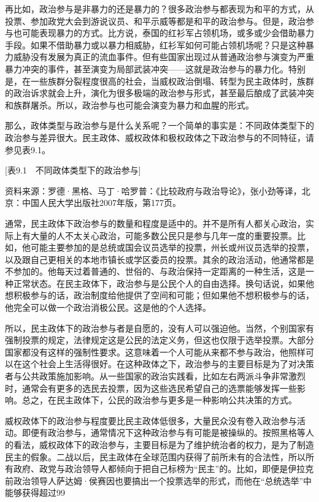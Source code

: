 {再比如，政治参与是非暴力的还是暴力的？很多政治参与都表现为和平的方式，从投票、参加政党大会到游说议员、和平示威等都是和平的政治参与。但是，政治参与也可能表现暴力的方式。比方说，泰国的红衫军占领机场，或多或少会借助暴力手段。如果不借助暴力或以暴力相威胁，红衫军如何可能占领机场呢？只是这种暴力威胁没有发展为真正的流血事件。但有些国家出现过从普通政治参与演变为严重暴力冲突的事件，甚至演变为局部武装冲突——这就是政治参与的暴力化。特别是，在一些族群分裂程度很高的社会，当威权政治倒塌、转型为民主政体时，族群的政治诉求就会上升，演化为很多极端的政治参与形式，甚至最后酿成了武装冲突和族群屠杀。所以，政治参与也可能会演变为暴力和血腥的形式。


那么，政体类型与政治参与是什么关系呢？一个简单的事实是：不同政体类型下的政治参与差异很大。民主政体、威权政体和极权政体之下政治参与的不同特征，请参见表9.1。

[表9.1　不同政体类型下的政治参与]

资料来源：罗德·黑格、马丁·哈罗普：《比较政府与政治导论》，张小劲等译，北京：中国人民大学出版社2007年版，第177页。

通常，民主政体下政治参与的数量和程度是适中的。并不是所有人都关心政治，实际上有大量的人不太关心政治，可能多数公民只是参与几年一度的重要投票。比如，他可能主要参加的是总统或国会议员选举的投票，州长或州议员选举的投票，以及跟自己更相关的本地市镇长或学区委员的投票。其余的政治活动，他通常都是不参加的。他每天过着普通的、世俗的、与政治保持一定距离的一种生活，这是一种正常状态。在民主政体下，政治参与是公民个人的自由选择。换句话说，如果他想积极参与的话，政治制度给他提供了空间和可能；但如果他不想积极参与的话，他完全可以做一个政治消极公民。这是他的个人选择。

所以，民主政体下的政治参与者是自愿的，没有人可以强迫他。当然，个别国家有强制投票的规定，法律规定这是公民的法定义务，但这也仅限于选举投票。大部分国家都没有这样的强制性要求。这意味着一个人可能从来都不参与政治，他照样可以在这个社会上生活得很好。在这种政体之下，政治参与的主要目标是为了对决策者与公共政策施加影响。从一些国家的政治实践看，比如左右两派斗争非常激烈时，通常会有更多的选民去投票，因为这些选民希望自己的选票能够发挥一些影响。总之，在民主政体下，公民的政治参与更多是一种影响公共决策的方式。

威权政体下的政治参与程度要比民主政体低很多，大量民众没有卷入政治参与活动。即便有政治参与，通常情况下这种政治参与有可能是被操纵的。按照黑格等人的看法，威权政体下的政治参与，主要目标是为了维护统治者的权力，是为了制造民主的假象。二战以后，民主政体在全球范围内获得了前所未有的合法性，所以所有政府、政党与政治领导人都倾向于把自己标榜为“民主”的。比如，即便是伊拉克前政治领导人萨达姆·侯赛因也要搞出一个投票选举的形式，而他在“总统选举”中能够获得超过99%

}
